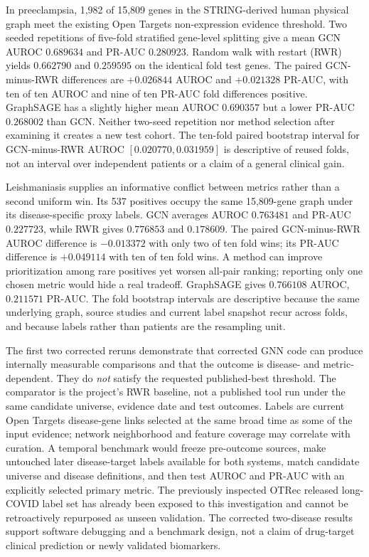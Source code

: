 \documentclass[11pt,a4paper]{article}
\begin{document}
In preeclampsia, 1,982 of 15,809 genes in the STRING-derived human physical graph meet the existing Open Targets non-expression evidence threshold. Two seeded repetitions of five-fold stratified gene-level splitting give a mean GCN AUROC $0.689634$ and PR-AUC $0.280923$. Random walk with restart (RWR) yields $0.662790$ and $0.259595$ on the identical fold test genes. The paired GCN-minus-RWR differences are $+0.026844$ AUROC and $+0.021328$ PR-AUC, with ten of ten AUROC and nine of ten PR-AUC fold differences positive. GraphSAGE has a slightly higher mean AUROC $0.690357$ but a lower PR-AUC $0.268002$ than GCN. Neither two-seed repetition nor method selection after examining it creates a new test cohort. The ten-fold paired bootstrap interval for GCN-minus-RWR AUROC $[0.020770,0.031959]$ is descriptive of reused folds, not an interval over independent patients or a claim of a general clinical gain.

Leishmaniasis supplies an informative conflict between metrics rather than a second uniform win. Its 537 positives occupy the same 15,809-gene graph under its disease-specific proxy labels. GCN averages AUROC $0.763481$ and PR-AUC $0.227723$, while RWR gives $0.776853$ and $0.178609$. The paired GCN-minus-RWR AUROC difference is $-0.013372$ with only two of ten fold wins; its PR-AUC difference is $+0.049114$ with ten of ten fold wins. A method can improve prioritization among rare positives yet worsen all-pair ranking; reporting only one chosen metric would hide a real tradeoff. GraphSAGE gives $0.766108$ AUROC, $0.211571$ PR-AUC. The fold bootstrap intervals are descriptive because the same underlying graph, source studies and current label snapshot recur across folds, and because labels rather than patients are the resampling unit.

The first two corrected reruns demonstrate that corrected GNN code can produce internally measurable comparisons and that the outcome is disease- and metric-dependent. They do \emph{not} satisfy the requested published-best threshold. The comparator is the project's RWR baseline, not a published tool run under the same candidate universe, evidence date and test outcomes. Labels are current Open Targets disease-gene links selected at the same broad time as some of the input evidence; network neighborhood and feature coverage may correlate with curation. A temporal benchmark would freeze pre-outcome sources, make untouched later disease-target labels available for both systems, match candidate universe and disease definitions, and then test AUROC and PR-AUC with an explicitly selected primary metric. The previously inspected OTRec released long-COVID label set has already been exposed to this investigation and cannot be retroactively repurposed as unseen validation. The corrected two-disease results support software debugging and a benchmark design, not a claim of drug-target clinical prediction or newly validated biomarkers.
\end{document}

